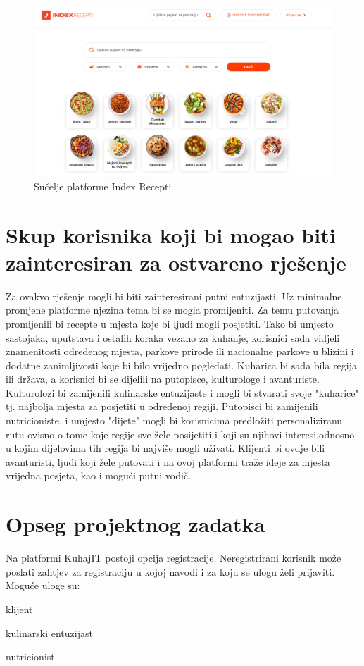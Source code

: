 		\begin{figure}[H]
			\includegraphics[scale=0.4]{slike/indexRecepti.PNG} %
			\centering
			\caption{Sučelje platforme Index Recepti}
			\label{indexRecepti}
		\end{figure}
		
		\section{Skup korisnika koji bi mogao biti zainteresiran za ostvareno rješenje}
		
		Za ovakvo rješenje mogli bi biti zainteresirani putni entuzijasti. Uz minimalne promjene platforme njezina tema bi se mogla promijeniti. Za temu putovanja promijenili bi recepte u mjesta koje bi ljudi mogli posjetiti. Tako bi umjesto sastojaka, uputstava i ostalih koraka vezano za kuhanje, korisnici sada vidjeli znamenitosti određenog mjesta, parkove prirode ili nacionalne parkove u blizini i dodatne zanimljivosti koje bi bilo vrijedno pogledati. Kuharica bi sada bila regija ili država, a korisnici bi se dijelili na putopisce, kulturologe i avanturiste. Kulturolozi bi zamijenili kulinarske entuzijaste i mogli bi stvarati svoje "kuharice" tj. najbolja mjesta za posjetiti u određenoj regiji. Putopisci bi zamijenili nutricioniste, i umjesto "dijete" mogli bi korisnicima predložiti personaliziranu rutu ovisno o tome koje regije sve žele posijetiti i koji su njihovi interesi,odnosno u kojim dijelovima tih regija bi najviše mogli uživati. Klijenti bi ovdje bili avanturisti, ljudi koji žele putovati i na ovoj platformi traže ideje za mjesta vrijedna posjeta, kao i mogući putni vodič.
		
		\section{Opseg projektnog zadatka}
		Na platformi KuhajIT postoji opcija registracije.
		Neregistrirani korisnik može poslati zahtjev za registraciju u kojoj navodi i za koju se ulogu želi prijaviti. Moguće uloge su:
		\begin{packed_item}
		    \item klijent
		    \item kulinarski entuzijast
		    \item nutricionist
		\end{packed_item}
		
